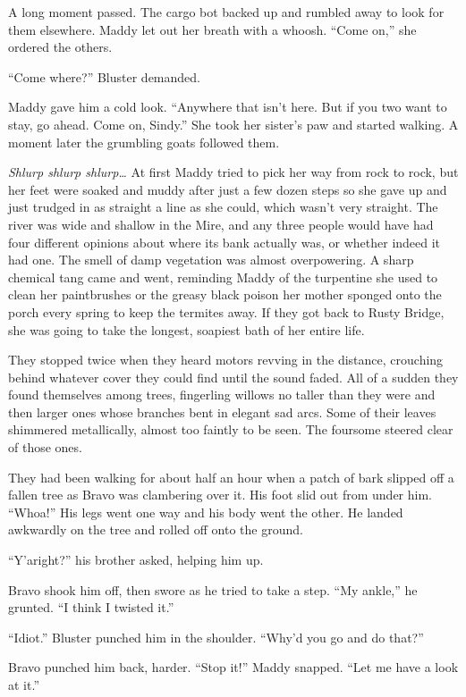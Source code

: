 \documentclass[10pt]{article}
\begin{document}
A long moment passed. The cargo bot backed up and rumbled away to look
for them elsewhere. Maddy let out her breath with a whoosh. ``Come on,''
she ordered the others.

``Come where?'' Bluster demanded.

Maddy gave him a cold look. ``Anywhere that isn't here. But if you two
want to stay, go ahead. Come on, Sindy.'' She took her sister's paw and
started walking. A moment later the grumbling goats followed them.

\emph{Shlurp shlurp shlurp\ldots{}} At first Maddy tried to pick her way
from rock to rock, but her feet were soaked and muddy after just a few
dozen steps so she gave up and just trudged in as straight a line as she
could, which wasn't very straight. The river was wide and shallow in the
Mire, and any three people would have had four different opinions about
where its bank actually was, or whether indeed it had one. The smell of
damp vegetation was almost overpowering. A sharp chemical tang came and
went, reminding Maddy of the turpentine she used to clean her
paintbrushes or the greasy black poison her mother sponged onto the
porch every spring to keep the termites away. If they got back to Rusty
Bridge, she was going to take the longest, soapiest bath of her entire
life.

They stopped twice when they heard motors revving in the distance,
crouching behind whatever cover they could find until the sound faded.
All of a sudden they found themselves among trees, fingerling willows no
taller than they were and then larger ones whose branches bent in
elegant sad arcs. Some of their leaves shimmered metallically, almost
too faintly to be seen. The foursome steered clear of those ones.

They had been walking for about half an hour when a patch of bark
slipped off a fallen tree as Bravo was clambering over it. His foot slid
out from under him. ``Whoa!'' His legs went one way and his body went
the other. He landed awkwardly on the tree and rolled off onto the
ground.

``Y'aright?'' his brother asked, helping him up.

Bravo shook him off, then swore as he tried to take a step. ``My
ankle,'' he grunted. ``I think I twisted it.''

``Idiot.'' Bluster punched him in the shoulder. ``Why'd you go and do
that?''

Bravo punched him back, harder. ``Stop it!'' Maddy snapped. ``Let me
have a look at it.''
\end{document}
